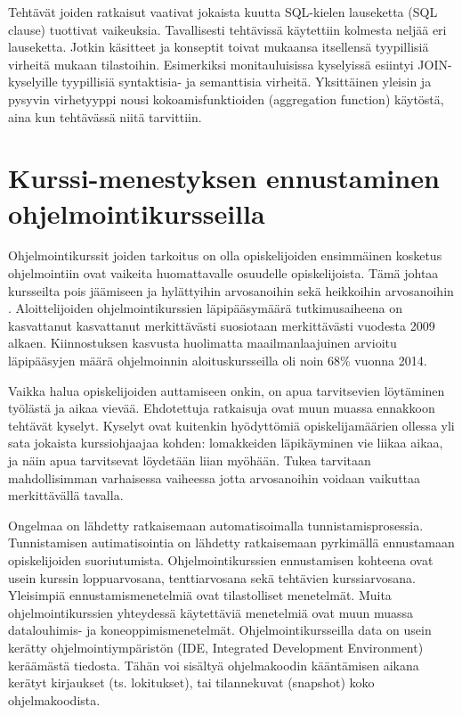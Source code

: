 \documentclass[finnish,twoside,openright]{HYgraduMLDS}
\begin{document}
Tehtävät joiden ratkaisut vaativat jokaista kuutta SQL-kielen lauseketta (SQL clause) tuottivat vaikeuksia\cite{Taipalus:2019:EFS:3287324.3287359}. Tavallisesti tehtävissä käytettiin kolmesta neljää eri lauseketta. Jotkin käsitteet ja konseptit toivat mukaansa itsellensä tyypillisiä virheitä mukaan tilastoihin. Esimerkiksi monitauluisissa kyselyissä esiintyi JOIN-kyselyille tyypillisiä syntaktisia- ja semanttisia virheitä. Yksittäinen yleisin ja pysyvin virhetyyppi nousi kokoamisfunktioiden (aggregation function) käytöstä, aina kun tehtävässä niitä tarvittiin. 


\section{Kurssi-menestyksen ennustaminen ohjelmointikursseilla}

Ohjelmointikurssit joiden tarkoitus on olla opiskelijoiden ensimmäinen kosketus ohjelmointiin ovat vaikeita huomattavalle osuudelle opiskelijoista. Tämä johtaa kursseilta pois jäämiseen ja hylättyihin arvosanoihin sekä heikkoihin arvosanoihin \cite{bergin2015using}. Aloittelijoiden ohjelmointikurssien läpipääsymäärä tutkimusaiheena on kasvattanut kasvattanut merkittävästi suosiotaan merkittävästi vuodesta 2009 alkaen\cite{hellas2018predicting}. Kiinnostuksen kasvusta huolimatta maailmanlaajuinen arvioitu läpipääsyjen määrä ohjelmoinnin aloituskursseilla oli noin 68\% vuonna 2014\cite{watson2014failure}. 

Vaikka halua opiskelijoiden auttamiseen onkin, on apua tarvitsevien löytäminen työlästä ja aikaa vievää. Ehdotettuja ratkaisuja ovat muun muassa ennakkoon tehtävät kyselyt\cite{watson2014no}. %
Kyselyt ovat kuitenkin hyödyttömiä opiskelijamäärien ollessa yli sata jokaista kurssiohjaajaa kohden: lomakkeiden läpikäyminen vie liikaa aikaa, ja näin apua tarvitsevat löydetään liian myöhään. Tukea tarvitaan mahdollisimman varhaisessa vaiheessa jotta arvosanoihin voidaan vaikuttaa merkittävällä tavalla\cite{bergin2015using}. 

Ongelmaa on lähdetty ratkaisemaan automatisoimalla tunnistamisprosessia. Tunnistamisen autimatisointia on lähdetty ratkaisemaan pyrkimällä ennustamaan opiskelijoiden suoriutumista. Ohjelmointikurssien ennustamisen kohteena ovat usein kurssin loppuarvosana, tenttiarvosana sekä tehtävien kurssiarvosana. Yleisimpiä ennustamismenetelmiä ovat tilastolliset menetelmät\cite{hellas2018predicting}. Muita ohjelmointikurssien yhteydessä käytettäviä menetelmiä ovat muun muassa datalouhimis- ja koneoppimismenetelmät. Ohjelmointikursseilla data on usein kerätty ohjelmointiympäristön (IDE, Integrated Development Environment) keräämästä tiedosta. Tähän voi sisältyä ohjelmakoodin kääntämisen aikana kerätyt kirjaukset (ts. lokitukset), tai tilannekuvat (snapshot) koko ohjelmakoodista\cite{watson2013predicting, jadud2006methods, lagus2018transfer}.
\end{document}
